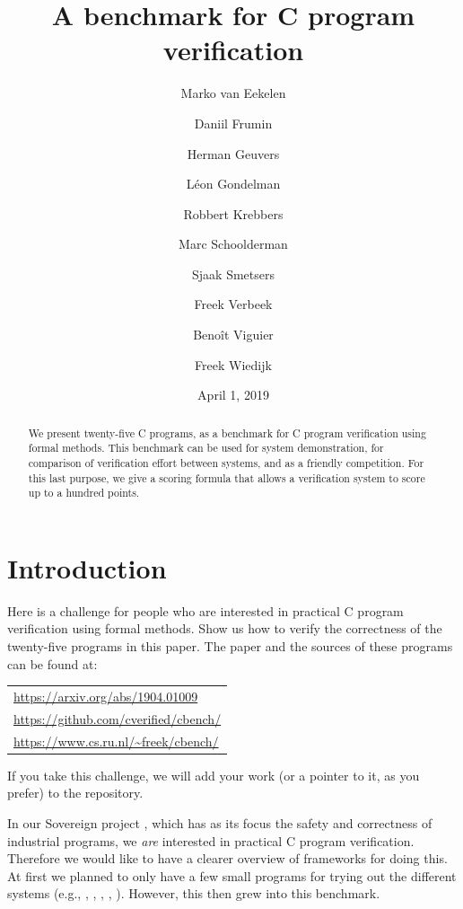 \documentclass{article}
\begin{document}
\title{A benchmark for C program verification}
\author{%
Marko van Eekelen \and
Daniil Frumin \and
Herman Geuvers \and
L\'eon Gondelman \and
Robbert Krebbers \and
Marc Schoolderman \and
Sjaak Smetsers \and
Freek Verbeek \and
Beno\^it Viguier \and
Freek Wiedijk
}
\date{April 1, 2019}
\maketitle

\begin{abstract}
\noindent
We present twenty-five C programs, as a benchmark for
C program verification using formal methods.
%
This benchmark can be used for system demonstration,
for comparison of verification effort between systems,
and as a friendly competition.
For this last purpose, we give a scoring formula that allows
a verification system to score up to a hundred points.
\end{abstract}

\section{Introduction}

Here is a challenge for people who are interested in practical C program verification using formal methods.
Show us how to verify the correctness of the twenty-five programs in this paper.
The paper and the sources of these programs can be found at:
\begin{center}
\begin{tabular}{l}
\url{https://arxiv.org/abs/1904.01009} \\
\url{https://github.com/cverified/cbench/} \\
\url{https://www.cs.ru.nl/~freek/cbench/}
\end{tabular}
\end{center}
If you take this challenge, we will add
your work (or a pointer to it, as you prefer) to the repository.

In our Sovereign project \cite{eek:geu:sme:wie:14}, which has as its focus the safety and correctness of industrial programs, we \emph{are} interested in practical C program verification.
Therefore we would like to have a clearer overview of frameworks for doing this.
At first we planned to only have a few small programs for trying out the different systems (e.g., \cite{app:11}, \cite{cor:cuo:kir:mar:pre:puc:sig:yak:18}, \cite{dah:mos:san:tob:sch:09}, \cite{gre:and:klei:12}, \cite{jac:sma:phi:vog:pen:pie:11}).
However, this then grew into this benchmark.
\end{document}
